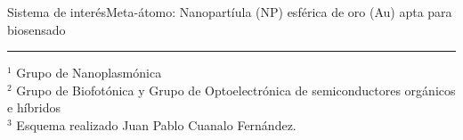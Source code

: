 \begin{frame}{Sistema de interés}{Meta-átomo: Nanopartíula (NP) esférica de oro (Au) apta para biosensado}
\begin{center}
    \end{center}

    \vspace*{-3.5em}
        \noindent\rule{.25\textwidth}{0.4pt}
         \begin{spacing}{0}\fontsize{4}{12} \selectfont
            $^1$ Grupo de Nanoplasmónica\\
            $^2$ Grupo de Biofotónica y Grupo de Optoelectrónica de semiconductores orgánicos e híbridos\\
            $^3$ Esquema realizado Juan Pablo Cuanalo Fernández.
         \end{spacing}
\end{frame}
